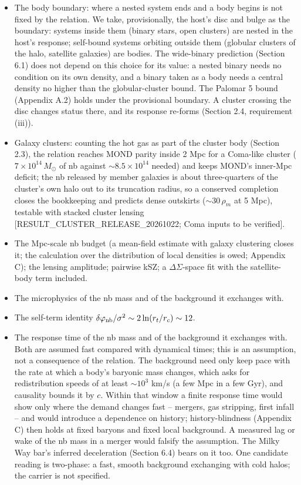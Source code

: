 \documentclass[
  10pt,
]{article}
\begin{document}
\begin{itemize}
\item The body boundary: where a nested system ends and a body begins is not fixed by the relation. We take, provisionally, the host's disc and bulge as the boundary: systems inside them (binary stars, open clusters) are nested in the host's response; self-bound systems orbiting outside them (globular clusters of the halo, satellite galaxies) are bodies. The wide-binary prediction (Section 6.1) does not depend on this choice for its value: a nested binary needs no condition on its own density, and a binary taken as a body needs a central density no higher than the globular-cluster bound. The Palomar 5 bound (Appendix A.2) holds under the provisional boundary. A cluster crossing the disc changes status there, and its response re-forms (Section 2.4, requirement (iii)).
\item Galaxy clusters: counting the hot gas as part of the cluster body (Section 2.3), the relation reaches MOND parity inside 2 Mpc for a Coma-like cluster ($7\times10^{14}\,M_\odot$ of nb against $\sim8.5\times10^{14}$ needed) and keeps MOND's inner-Mpc deficit; the nb released by member galaxies is about three-quarters of the cluster's own halo out to its truncation radius, so a conserved completion closes the bookkeeping and predicts dense outskirts ($\sim30\,\rho_m$ at 5 Mpc), testable with stacked cluster lensing {[}RESULT\_CLUSTER\_RELEASE\_20261022; Coma inputs to be verified{]}.
\item The Mpc-scale nb budget (a mean-field estimate with galaxy clustering closes it; the calculation over the distribution of local densities is owed; Appendix C); the lensing amplitude; pairwise kSZ; a $\Delta\Sigma$-space fit with the satellite-body term included.
\item The microphysics of the nb mass and of the background it exchanges with.
\item The self-term identity $\delta\varphi_{\rm nb}/\sigma^2\sim 2\ln(r_t/r_c)\sim 12$.
\item The response time of the nb mass and of the background it exchanges with. Both are assumed fast compared with dynamical times; this is an assumption, not a consequence of the relation. The background need only keep pace with the rate at which a body's baryonic mass changes, which asks for redistribution speeds of at least $\sim10^3$ km/s (a few Mpc in a few Gyr), and causality bounds it by $c$. Within that window a finite response time would show only where the demand changes fast -- mergers, gas stripping, first infall -- and would introduce a dependence on history; history-blindness (Appendix C) then holds at fixed baryons and fixed local background. A measured lag or wake of the nb mass in a merger would falsify the assumption. The Milky Way bar's inferred deceleration (Section 6.4) bears on it too. One candidate reading is two-phase: a fast, smooth background exchanging with cold halos; the carrier is not specified.

\end{itemize}
\end{document}
